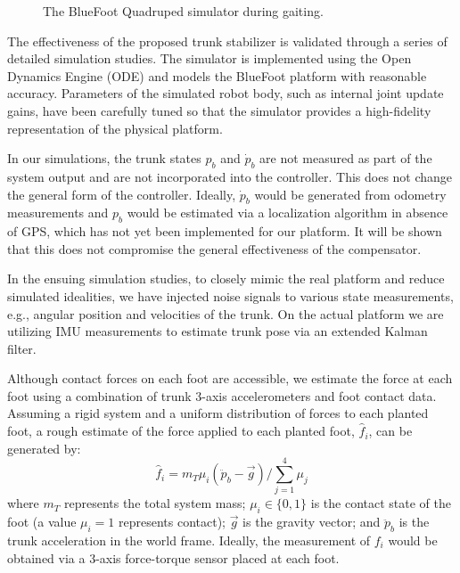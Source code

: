	\begin{figure}[b!]\centering
		\vspace{-5mm}
		\caption{ The BlueFoot Quadruped simulator during gaiting. }
		\label{fig::bluefoot}
	\end{figure}
The effectiveness of the proposed trunk stabilizer is validated through a series of detailed simulation studies. 
The simulator is implemented using the Open Dynamics Engine (ODE) \cite{OpenDynamicsEngine} and models the BlueFoot platform with 
reasonable accuracy. Parameters of the simulated robot body, such as internal joint update
gains, have been carefully tuned so that the simulator provides a high-fidelity representation of the 
physical platform.

In our simulations, the trunk states $p_{b}$ and $\dot{p}_{b}$ are not measured as part of the system output and
are not incorporated into the controller. This does not change the general form of the controller. Ideally, $\dot{p}_{b}$ 
would be generated from odometry measurements and ${p}_{b}$ would be estimated via a localization algorithm in absence of GPS, which 
has not yet been implemented for our platform. It will be shown that this does not compromise the general effectiveness 
of the compensator.

In the ensuing simulation studies, to closely mimic  the real platform and reduce simulated idealities, we have injected noise
signals to various state measurements, e.g., angular position and velocities of the trunk. On the actual platform
we are utilizing IMU measurements to estimate trunk pose via an extended Kalman filter.


Although contact forces on each foot are accessible, we estimate the force at each foot using a combination
of trunk 3-axis accelerometers and foot contact data. Assuming a rigid system and a uniform distribution of 
forces to each planted foot, a rough estimate of the force applied to each \Ith planted foot, $\hat{f}_{i}$, can be generated by:
	\vspace{-2mm}
	\begin{equation}
		\hat{f}_{i} = {m_{T}\mu_{i}} \left(\ddot{p}_{b} - \vec{g}\right)/{\sum_{j=1}^{4}{\mu_{j}}}
	\end{equation}
where $m_{T}$ represents the total system mass; $\mu_{i}\in \{0,1\}$ is the contact state of the \Ith
foot (a value $\mu_{i}=1$ represents contact); $\vec{g}$ is the gravity vector; and $\ddot{p}_{b}$ is the trunk
acceleration in the world frame. Ideally, the measurement of ${f}_{i}$ would be obtained via a 3-axis force-torque 
sensor placed at each foot.



